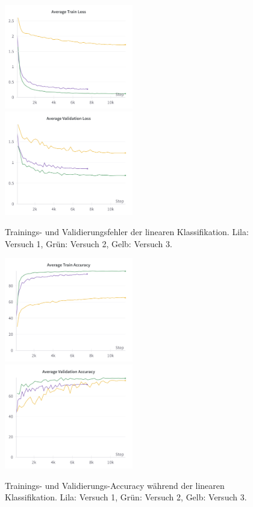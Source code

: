 \begin{figure}
	\centering
	\includegraphics[width=0.5\textwidth]{figure_results_supcon-lin_avg-train-loss.png}%
	\includegraphics[width=0.5\textwidth]{figure_results_supcon-lin_avg-val-loss.png}
	\caption[Trainings- und Validierungsfehler der linearen Klassifikation.]{Trainings- und Validierungsfehler der linearen Klassifikation. \textcolor{exp1}{Lila}: Versuch 1, \textcolor{exp2}{Grün}: Versuch 2, \textcolor{exp3}{Gelb}: Versuch 3.}
	\label{fig:supcon-lin-loss}
\end{figure}
\begin{figure}
	\centering
	\includegraphics[width=0.5\textwidth]{figure_results_supcon-lin_avg-train-acc.png}%
	\includegraphics[width=0.5\textwidth]{figure_results_supcon-lin_avg-val-acc.png}
	\caption[Trainings- und Validierungs-Accuracy während der linearen Klassifikation.]{Trainings- und Validierungs-Accuracy während der linearen Klassifikation. \textcolor{exp1}{Lila}: Versuch 1, \textcolor{exp2}{Grün}: Versuch 2, \textcolor{exp3}{Gelb}: Versuch 3.}
	\label{fig:supcon-lin-acc}
\end{figure}
